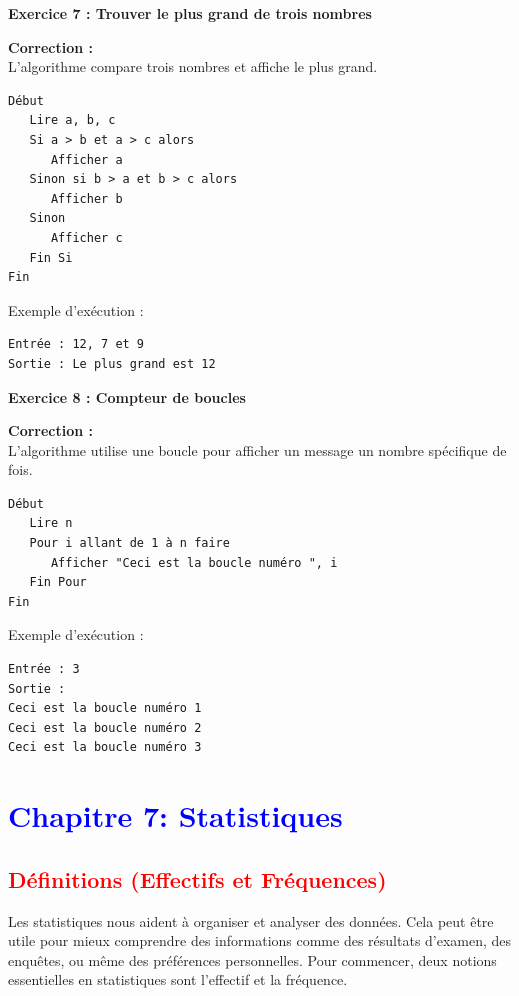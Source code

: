 \documentclass{article}
\begin{document}
\begin{tcolorbox}[colback=green!10!white, colframe=green!75!black, title=\textcolor{white}{  Corrections}]

\textbf{Exercice 7 : Trouver le plus grand de trois nombres}

\textbf{Correction :} \\
L'algorithme compare trois nombres et affiche le plus grand.

\begin{verbatim}
Début
   Lire a, b, c
   Si a > b et a > c alors
      Afficher a
   Sinon si b > a et b > c alors
      Afficher b
   Sinon
      Afficher c
   Fin Si
Fin
\end{verbatim}

Exemple d'exécution :
\begin{verbatim}
Entrée : 12, 7 et 9
Sortie : Le plus grand est 12
\end{verbatim}

\vspace{0.5cm}

\textbf{Exercice 8 : Compteur de boucles}

\textbf{Correction :} \\
L'algorithme utilise une boucle pour afficher un message un nombre spécifique de fois.

\begin{verbatim}
Début
   Lire n
   Pour i allant de 1 à n faire
      Afficher "Ceci est la boucle numéro ", i
   Fin Pour
Fin
\end{verbatim}

Exemple d'exécution :
\begin{verbatim}
Entrée : 3
Sortie :
Ceci est la boucle numéro 1
Ceci est la boucle numéro 2
Ceci est la boucle numéro 3
\end{verbatim}
\end{tcolorbox}

\newpage
\section{\textcolor{blue}{Chapitre 7: Statistiques}}

\subsection{\textcolor{red}{Définitions (Effectifs et Fréquences)}}

Les statistiques nous aident à organiser et analyser des données. Cela peut être utile pour mieux comprendre des informations comme des résultats d'examen, des enquêtes, ou même des préférences personnelles. Pour commencer, deux notions essentielles en statistiques sont l'effectif et la fréquence. 
\end{document}
